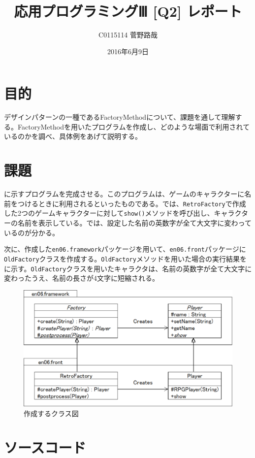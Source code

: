 \documentclass[uplatex]{jsarticle}
\title{応用プログラミングⅢ [Q2] レポート}
\author{C0115114 菅野路哉}
\date{2016年6月9日}
\begin{document}
\maketitle

\section{目的}
デザインパターンの一種であるFactoryMethodについて、課題を通して理解する。FactoryMethodを用いたプログラムを作成し、どのような場面で利用されているのかを調べ、具体例をあげて説明する。

\section{課題}
に示すプログラムを完成させる。このプログラムは、ゲームのキャラクターに名前をつけるときに利用されるといったものである。では、{\tt RetroFactory}で作成した2つのゲームキャラクターに対して{\tt show()}メソッドを呼び出し、キャラクターの名前を表示している。では、設定した名前の英数字が全て大文字に変わっているのが分かる。


次に、作成した{\tt en06.framework}パッケージを用いて、{\tt en06.front}パッケージに{\tt OldFactory}クラスを作成する。{\tt OldFactory}メソッドを用いた場合の実行結果をに示す。{\tt OldFactory}クラスを用いたキャラクタは、名前の英数字が全て大文字に変わったうえ、名前の長さが4文字に短縮される。

\begin{figure}[h]
  \begin{center}
    \includegraphics[width=0.8\linewidth]{uml.eps}
    \caption{作成するクラス図}
    \label{uml}
  \end{center}
\end{figure}

\newpage

\section{ソースコード}
\end{document}
